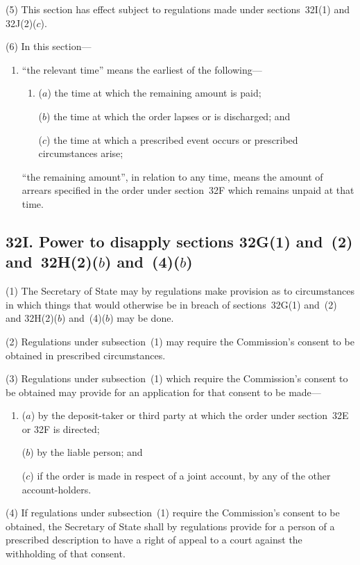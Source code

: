 \documentclass[12pt,a4paper]{article}
\begin{document}
(5) This section has effect subject to regulations made under sections~32I(1) and
32J(2)($c$).

(6) In this section---
\begin{enumerate}\item[]
“the relevant time” means the earliest of the following---
\begin{enumerate}\item[]
($a$) the time at which the remaining amount is paid;

($b$) the time at which the order lapses or is discharged; and

($c$) the time at which a prescribed event occurs or prescribed circumstances
arise;
\end{enumerate}

“the remaining amount”, in relation to any time, means the amount of arrears
specified in the order under section~32F which remains unpaid at that time.
\end{enumerate}

\begin{sloppypar}
\subsection{32I. Power to disapply sections 32G(1) and~(2) and~32H(2)($b$) and~(4)($b$)}
\end{sloppypar}

(1) The Secretary of State may by regulations make provision as to
circumstances in which things that would otherwise be in breach of sections~32G(1) and~(2) and 32H(2)($b$) and~(4)($b$) may be done.

(2) Regulations under subsection~(1) may require the Commission’s consent
to be obtained in prescribed circumstances.

(3) Regulations under subsection~(1) which require the Commission’s consent
to be obtained may provide for an application for that consent to be made---
\begin{enumerate}\item[]
($a$) by the deposit-taker or third party at which the order under section~32E or
32F is directed;

($b$) by the liable person; and

($c$) if the order is made in respect of a joint account, by any of the other account-holders.
\end{enumerate}

(4) If regulations under subsection~(1) require the Commission’s consent to
be obtained, the Secretary of State shall by regulations provide for a person of a
prescribed description to have a right of appeal to a court against the withholding of
that consent.
\end{document}
